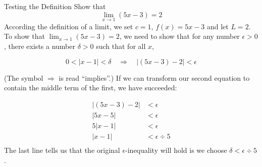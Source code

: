 \begin{example}{Testing the Definition}
	\exProblem
Show that
$$
\lim_{x\rightarrow 1} (5x-3)=2
$$
	\exSolution
According the definition of a limit, we set $c=1$, $f(x)=5x-3$ and let
$L=2$.  To show that $\displaystyle \lim_{x\rightarrow 1}(5x-3)=2$, we need to show that for
any number $\epsilon>0$, there exists a number $\delta>0$ such that for all $x$,

$$
0<|x-1|<\delta \quad \Rightarrow \quad |(5x-3)-2|<\epsilon 
$$

(The symbol $\Rightarrow$ is read ``implies''.)  If we can transform our second equation to 
contain the middle term of the first, we have succeeded:

\begin{align*}
|(5x-3)-2| & < \epsilon \\
|5x-5| & <\epsilon \\
5|x-1| & <\epsilon \\
|x-1| & < \epsilon \div 5\\
\end{align*}
The last line tells us that the original $\epsilon$-inequality will hold is we choose
$\delta < \epsilon \div 5$.


\end{example}